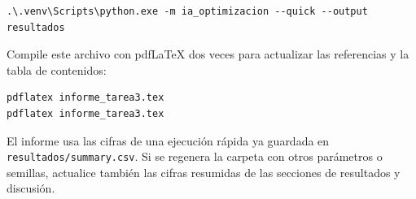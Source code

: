 \documentclass[12pt,letterpaper]{article}
\begin{document}
\begin{verbatim}
.\.venv\Scripts\python.exe -m ia_optimizacion --quick --output resultados
\end{verbatim}

Compile este archivo con pdfLaTeX dos veces para actualizar las referencias y
la tabla de contenidos:

\begin{verbatim}
pdflatex informe_tarea3.tex
pdflatex informe_tarea3.tex
\end{verbatim}

El informe usa las cifras de una ejecución rápida ya guardada en
\texttt{resultados/summary.csv}. Si se regenera la carpeta con otros parámetros
o semillas, actualice también las cifras resumidas de las secciones de
resultados y discusión.
\end{document}
